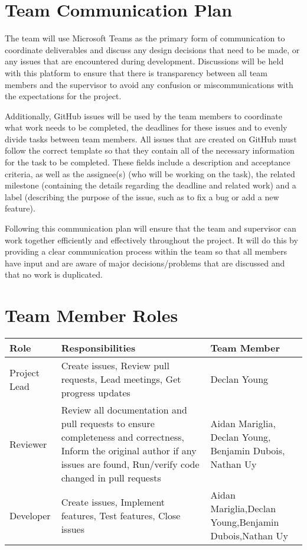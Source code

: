 \documentclass{article}
\begin{document}
\section{Team Communication Plan}

The team will use Microsoft Teams as the primary form of communication to coordinate deliverables and discuss any design decisions that need to be made, or any issues that are encountered during development. Discussions will be held with this platform to ensure that there is transparency between all team members and the supervisor to avoid any confusion or miscommunications with the expectations for the project. 

Additionally, GitHub issues will be used by the team members to coordinate what work needs to be completed, the deadlines for these issues and to evenly divide tasks between team members. All issues that are created on GitHub must follow the correct template so that they contain all of the necessary information for the task to be completed. These fields include a description and acceptance criteria, as well as the assignee(s) (who will be working on the task), the related milestone (containing the details regarding the deadline and related work) and a label (describing the purpose of the issue, such as to fix a bug or add a new feature).

Following this communication plan will ensure that the team and supervisor can work together efficiently and effectively throughout the project. It will do this by providing a clear communication process within the team so that all members have input and are aware of major decisions/problems that are discussed and that no work is duplicated.

\section{Team Member Roles}

\begin{table}[H]
\begin{tabular}{|p{3cm}|p{4cm}|p{3cm}|}
\hline
\textbf{Role} & \textbf{Responsibilities} & \textbf{Team Member} \\ \hline

Project Lead & Create issues, Review pull requests, Lead meetings, Get progress updates & Declan Young \\ \hline

Reviewer & Review all documentation and pull requests to ensure completeness and correctness, Inform the original author if any issues are found, Run/verify code changed in pull requests & Aidan Mariglia, Declan Young, Benjamin Dubois, Nathan Uy \\ \hline

Developer & Create issues, Implement features, Test features, Close issues & Aidan Mariglia,Declan Young,Benjamin Dubois,Nathan Uy \\ \hline
\end{tabular}
\end{table}
\end{document}
